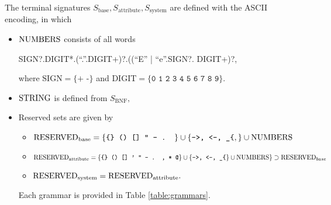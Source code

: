 The terminal signatures $S_{\mathrm{base}}, S_{\mathrm{attribute}}, S_{\mathrm{system}}$ are defined with the ASCII encoding, in which
\begin{itemize}
  \item $\mathrm{NUMBERS}$ consists of all words
  \begin{center}
    SIGN?.DIGIT*.(``.''.DIGIT+)?.((``E'' | ``e''.SIGN?. DIGIT+)?,
  \end{center}
  where $\mathrm{SIGN} = \{\texttt{+ -}\}$ and $\mathrm{DIGIT} = \{\texttt{0 1 2 3 4 5 6 7 8 9}\}.$
  \item $\mathrm{STRING}$ is defined from $S_{\mathrm{BNF}},$
\item Reserved sets are given by
\begin{itemize}
\item $\mathrm{RESERVED}_{\textrm{base}} = \{\texttt{\{\} () [] " - . }\} \cup \{\texttt{->, <-, \_\{},\} \cup \mathrm{NUMBERS} $
  \item $\mathrm{RESERVED}_{\textrm{attribute}} = \{\texttt{\{\} () [] ' " - . , * @}\} \cup \{\texttt{->, <-, \_\{}\} \cup \mathrm{NUMBERS} \} \supset \mathrm{RESERVED}_{base}$ %
\item $\mathrm{RESERVED}_{\textrm{system}} = \mathrm{RESERVED}_{\textrm{attribute}}.$
\end{itemize}



Each grammar is provided in Table \ref{table:grammars}.



\end{itemize}
